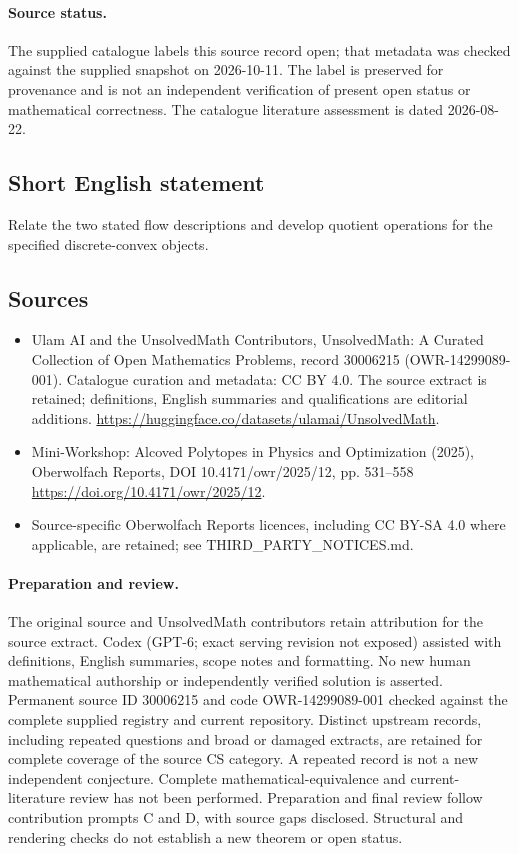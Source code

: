 \documentclass[11pt]{article}
\begin{document}
\paragraph{Source status.}
The supplied catalogue labels this source record open; that metadata was checked against the supplied snapshot on 2026-10-11. The label is preserved for provenance and is not an independent verification of present open status or mathematical correctness. The catalogue literature assessment is dated 2026-08-22.
\subsection{Short English statement}
Relate the two stated flow descriptions and develop quotient operations for the specified discrete-convex objects.
\subsection{Sources}
\begin{itemize}
\item[\hypertarget{source:30006215:1}{S1}] Ulam AI and the UnsolvedMath Contributors, UnsolvedMath: A Curated Collection of Open Mathematics Problems, record 30006215 (OWR-14299089-001). Catalogue curation and metadata: CC BY 4.0. The source extract is retained; definitions, English summaries and qualifications are editorial additions.
\url{https://huggingface.co/datasets/ulamai/UnsolvedMath}.
\item[\hypertarget{source:30006215:2}{S2}] Mini-Workshop: Alcoved Polytopes in Physics and Optimization (2025), Oberwolfach Reports, DOI 10.4171/owr/2025/12, pp. 531--558
\url{https://doi.org/10.4171/owr/2025/12}.
\item Source-specific Oberwolfach Reports licences, including CC BY-SA 4.0 where applicable, are retained; see THIRD\_PARTY\_NOTICES.md.
\end{itemize}
\paragraph{Preparation and review.}
The original source and UnsolvedMath contributors retain attribution for the source extract. Codex (GPT-6; exact serving revision not exposed) assisted with definitions, English summaries, scope notes and formatting. No new human mathematical authorship or independently verified solution is asserted. Permanent source ID 30006215 and code OWR-14299089-001 checked against the complete supplied registry and current repository. Distinct upstream records, including repeated questions and broad or damaged extracts, are retained for complete coverage of the source CS category. A repeated record is not a new independent conjecture. Complete mathematical-equivalence and current-literature review has not been performed. Preparation and final review follow contribution prompts C and D, with source gaps disclosed. Structural and rendering checks do not establish a new theorem or open status.
\label{end:30006215}
\end{document}
